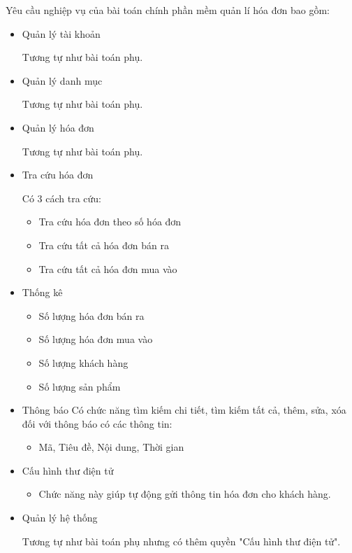 Yêu cầu nghiệp vụ của bài toán chính phần mềm quản lí hóa đơn bao gồm:

\begin{itemize}

\item Quản lý tài khoản

Tương tự như bài toán phụ.

\item Quản lý danh mục

Tương tự như bài toán phụ.

\item Quản lý hóa đơn

Tương tự như bài toán phụ.

\item Tra cứu hóa đơn

Có 3 cách tra cứu:

\begin{itemize}

\item Tra cứu hóa đơn theo số hóa đơn

\item Tra cứu tất cả hóa đơn bán ra

\item Tra cứu tất cả hóa đơn mua vào

\end{itemize}

\item Thống kê

\begin{itemize}

\item Số lượng hóa đơn bán ra

\item Số lượng hóa đơn mua vào

\item Số lượng khách hàng

\item Số lượng sản phẩm

\end{itemize}

\item Thông báo
Có chức năng tìm kiếm chi tiết, tìm kiếm tất cả, thêm, sửa, xóa đối với        thông báo  có các thông tin:

\begin{itemize}

\item Mã, Tiêu đề, Nội dung, Thời gian

\end{itemize}
\item Cấu hình thư điện tử

\begin{itemize}

\item Chức năng này giúp tự động gửi thông tin hóa đơn cho khách hàng.

\end{itemize}

\item Quản lý hệ thống

Tương tự như bài toán phụ nhưng có thêm quyền "Cấu hình thư điện tử".

\end{itemize}